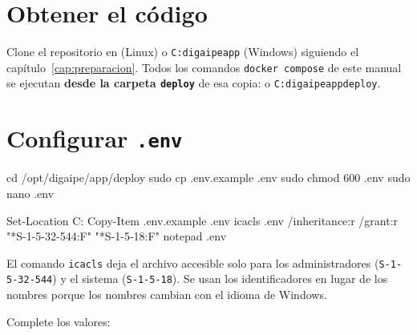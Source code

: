 \section{Obtener el código}

Clone el repositorio en  (Linux) o \texttt{C:\bs digaipe\bs app}
(Windows) siguiendo el capítulo~\ref{cap:preparacion}. Todos los comandos
\texttt{docker compose} de este manual se ejecutan \textbf{desde la carpeta \texttt{deploy}} de
esa copia:  o \texttt{C:\bs digaipe\bs app\bs deploy}.

\section{Configurar \texttt{.env}}

\begin{codigo}
cd /opt/digaipe/app/deploy
sudo cp .env.example .env
sudo chmod 600 .env
sudo nano .env
\end{codigo}

\begin{codigo}
Set-Location C:\digaipe\app\deploy
Copy-Item .env.example .env
icacls .env /inheritance:r /grant:r "*S-1-5-32-544:F" "*S-1-5-18:F"
notepad .env
\end{codigo}

El comando \texttt{icacls} deja el archivo accesible solo para los administradores
(\texttt{S-1-5-32-544}) y el sistema (\texttt{S-1-5-18}). Se usan los identificadores en lugar de
los nombres porque los nombres cambian con el idioma de Windows.

Complete los valores:

